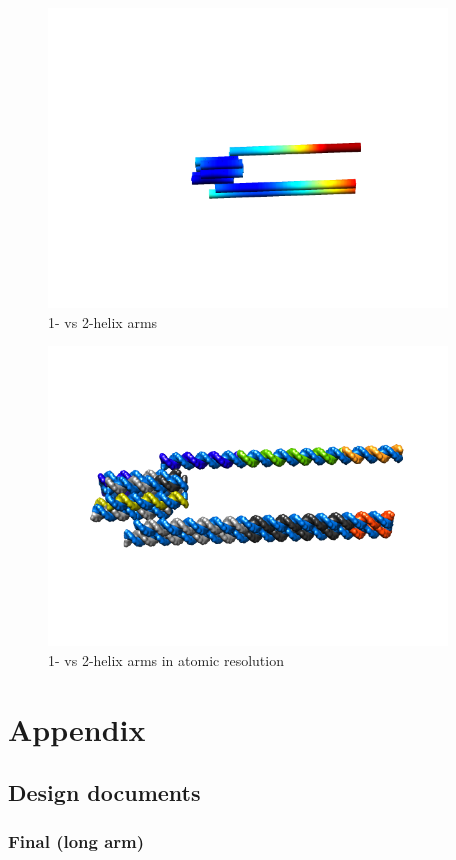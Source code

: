 \documentclass{article}
\begin{document}
\begin{figure}
\includegraphics[width=300pt]{single_arm_vs_double_heat}
\caption{1- vs 2-helix arms}
  \label{fig:single_arm2}
\end{figure}

\begin{figure}
\includegraphics[width=300pt]{single_arm_vs_double_atomic}
\caption{1- vs 2-helix arms in atomic resolution}
  \label{fig:single_arm3}
\end{figure}

\section{Appendix}
\subsection{Design documents}


\subsubsection{Final (long arm)}

\end{document}
